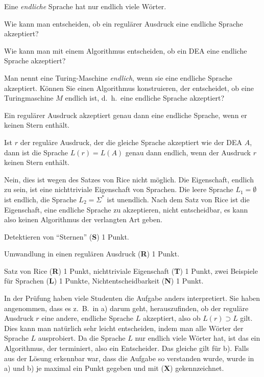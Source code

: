 Eine {\em endliche} Sprache hat nur endlich viele Wörter.
\begin{teilaufgaben}
\item
Wie kann man entscheiden, ob ein regulärer Ausdruck eine endliche
Sprache akzeptiert?
\item
Wie kann man mit einem Algorithmus entscheiden, ob ein DEA
eine endliche Sprache akzeptiert?
\item
Man nennt eine Turing-Maschine {\em endlich}, wenn sie eine endliche
Sprache akzeptiert.
Können Sie einen Algorithmus konstruieren, der entscheidet, ob eine
Turingmaschine $M$ endlich ist, d.~h.~eine endliche Sprache akzeptiert?
\end{teilaufgaben}

\begin{loesung}
\begin{teilaufgaben}
\item
Ein regulärer Ausdruck akzeptiert genau dann eine endliche Sprache, 
wenn er keinen Stern enthält.
\item
Ist $r$ der reguläre Ausdruck, der die gleiche Sprache akzeptiert
wie der DEA $A$, dann ist die Sprache $L(r)=L(A)$ genau dann endlich,
wenn der Ausdruck $r$ keinen Stern enthält.
\item
Nein, dies ist wegen des Satzes von Rice nicht möglich.
Die Eigenschaft, endlich zu sein, ist eine nichttriviale Eigenschaft
von Sprachen.
Die leere Sprache $L_1=\emptyset$ ist endlich, die Sprache $L_2=\Sigma^*$
ist unendlich.
Nach dem Satz von Rice ist die Eigenschaft, eine endliche Sprache zu
akzeptieren, nicht entscheidbar, es kann also keinen Algorithmus der
verlangten Art geben.
\qedhere
\end{teilaufgaben}
\end{loesung}

\begin{bewertung}
\begin{teilaufgaben}
\item
Detektieren von ``Sternen'' ({\bf S}) 1 Punkt.
\item
Umwandlung in einen regulären Ausdruck ({\bf R}) 1 Punkt.
\item
Satz von Rice ({\bf R}) 1 Punkt,
nichttriviale Eigenschaft ({\bf T}) 1 Punkt,
zwei Beispiele für Sprachen ({\bf L}) 1 Punkte,
Nichtentscheidbarkeit ({\bf N}) 1 Punkt.
\end{teilaufgaben}
In der Prüfung haben viele Studenten die Aufgabe anders interpretiert.
Sie haben angenommen, dass es z.~B.~in a) darum geht, herauszufinden,
ob der reguläre Ausdruck $r$ eine andere, endliche Sprache $L$ akzeptiert,
also ob $L(r) \supset L$ gilt.
Dies kann man natürlich sehr leicht entscheiden, indem man alle Wörter
der Sprache $L$ ausprobiert.
Da die Sprache $L$ nur endlich viele Wörter hat, ist das ein
Algorithmus, der terminiert, also ein Entscheider.
Das gleiche gilt für b).
Falls aus der Lösung erkennbar war, dass die Aufgabe so verstanden wurde,
wurde in a) und b) je maximal ein Punkt gegeben und mit ({\bf X})
gekennzeichnet.
\end{bewertung}
